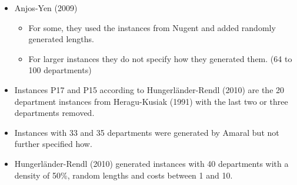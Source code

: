 \documentclass[a4paper]{article}
\begin{document}
\begin{itemize}
\begin{itemize}
    \end{itemize}
    \item  Anjos-Yen (2009)
    \begin{itemize}
        \item For some, they used the instances from Nugent and added randomly generated lengths. 
        \item For larger instances they do not specify how they generated them. (64 to 100 departments)
    \end{itemize}
    \item Instances P17 and P15 according to Hungerländer-Rendl (2010) are the 20 department instances from Heragu-Kusiak (1991) with the last two or three departments removed.
    \item Instances with 33 and 35 departments were generated by Amaral but not further specified how.
    \item Hungerländer-Rendl (2010) generated instances with 40 departments with a density of 50\%, random lengths and costs between 1 and 10.
\end{itemize}
\end{document}
